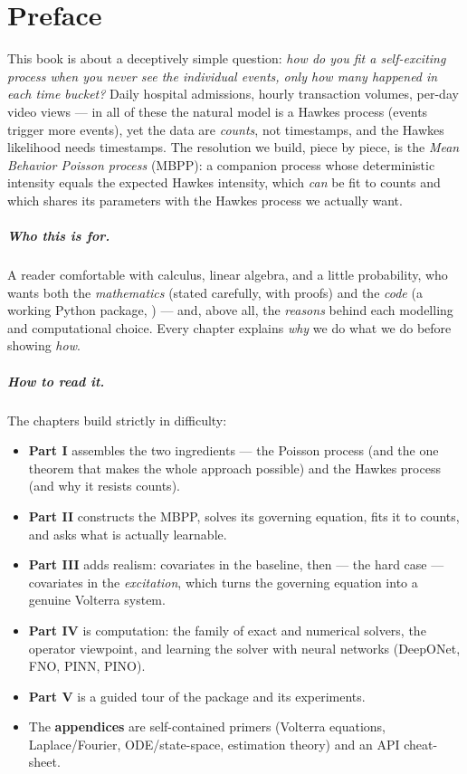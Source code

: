 \chapter*{Preface}

This book is about a deceptively simple question: \emph{how do you fit a
self-exciting process when you never see the individual events, only how many
happened in each time bucket?} Daily hospital admissions, hourly transaction
volumes, per-day video views --- in all of these the natural model is a Hawkes
process (events trigger more events), yet the data are \emph{counts}, not
timestamps, and the Hawkes likelihood needs timestamps. The resolution we build,
piece by piece, is the \emph{Mean Behavior Poisson process} (MBPP): a companion
process whose deterministic intensity equals the expected Hawkes intensity, which
\emph{can} be fit to counts and which shares its parameters with the Hawkes
process we actually want.

\paragraph{Who this is for.} A reader comfortable with calculus, linear algebra,
and a little probability, who wants both the \emph{mathematics} (stated
carefully, with proofs) and the \emph{code} (a working Python package,
) --- and, above all, the \emph{reasons} behind each
modelling and computational choice. Every chapter explains \emph{why} we do what
we do before showing \emph{how}.

\paragraph{How to read it.} The chapters build strictly in difficulty:

\begin{itemize}[leftmargin=1.4em]
\item \textbf{Part I} assembles the two ingredients --- the Poisson process (and the
one theorem that makes the whole approach possible) and the Hawkes process (and why
it resists counts).
\item \textbf{Part II} constructs the MBPP, solves its governing equation, fits it
to counts, and asks what is actually learnable.
\item \textbf{Part III} adds realism: covariates in the baseline, then --- the hard
case --- covariates in the \emph{excitation}, which turns the governing equation
into a genuine Volterra system.
\item \textbf{Part IV} is computation: the family of exact and numerical solvers,
the operator viewpoint, and learning the solver with neural networks (DeepONet,
FNO, PINN, PINO).
\item \textbf{Part V} is a guided tour of the package and its experiments.
\item The \textbf{appendices} are self-contained primers (Volterra equations,
Laplace/Fourier, ODE/state-space, estimation theory) and an API cheat-sheet.
\end{itemize}


